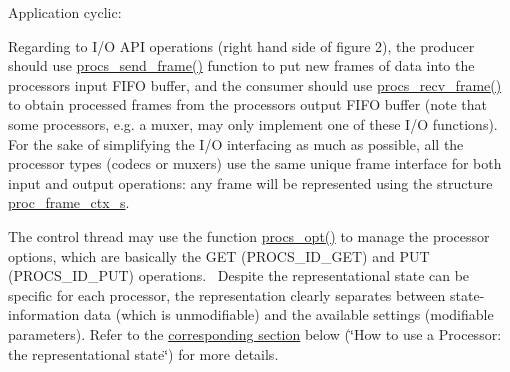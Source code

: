 \begin{DoxyItemize}
\begin{DoxyEnumerate}
\end{DoxyEnumerate}
\item Application cyclic\+:
\begin{DoxyEnumerate}
\item Regarding to I/O A\+PI operations (right hand side of figure 2), the producer should use \textquotesingle{}\hyperlink{procs_8c_aef6df524cba850594fa9fa23715ca3af}{procs\+\_\+send\+\_\+frame()}\textquotesingle{} function to put new frames of data into the processor\textquotesingle{}s input F\+I\+FO buffer, and the consumer should use \textquotesingle{}\hyperlink{procs_8c_a5be3851dc586c77c4ac8bb31654a6e2a}{procs\+\_\+recv\+\_\+frame()}\textquotesingle{} to obtain processed frames from the processor\textquotesingle{}s output F\+I\+FO buffer (note that some processors, e.\+g. a muxer, may only implement one of these I/O functions).~\newline
 For the sake of simplifying the I/O interfacing as much as possible, all the processor types (codecs or muxers) use the same unique frame interface for both input and output operations\+: any frame will be represented using the structure \textquotesingle{}\hyperlink{structproc__frame__ctx__s}{proc\+\_\+frame\+\_\+ctx\+\_\+s}\textquotesingle{}.~\newline

\item The control thread may use the function \textquotesingle{}\hyperlink{procs_8c_a7af2e6f2788006cfc96ca8d811922ffa}{procs\+\_\+opt()}\textquotesingle{} to manage the processor options, which are basically the G\+ET (\textquotesingle{}P\+R\+O\+C\+S\+\_\+\+I\+D\+\_\+\+G\+ET\textquotesingle{}) and P\+UT (\textquotesingle{}P\+R\+O\+C\+S\+\_\+\+I\+D\+\_\+\+P\+UT\textquotesingle{}) operations.~\newline
 Despite the representational state can be specific for each processor, the representation clearly separates between state-\/information data (which is unmodifiable) and the available settings (modifiable parameters). Refer to the \hyperlink{md_DOCUMENTATION_How_to_use_a_Processor_the_REST}{corresponding section} below (\char`\"{}\+How to use a Processor\+: the representational state\char`\"{}) for more details. ~\newline


\end{DoxyEnumerate}
\end{DoxyItemize}
